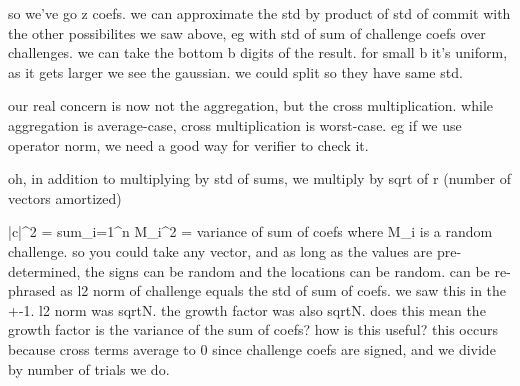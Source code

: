 so we've go z coefs.
we can approximate the std by product of std of commit with the other possibilites we saw above, eg with std of sum of challenge coefs over challenges.
we can take the bottom b digits of the result. for small b it's uniform, as it gets larger we see the gaussian.
we could split so they have same std.

our real concern is now not the aggregation, but the cross multiplication. while aggregation is average-case, cross multiplication is worst-case. eg if we use operator norm, we need a good way for verifier to check it.

oh, in addition to multiplying by std of sums, we multiply by sqrt of r (number of vectors amortized)



|c|^2 = sum_{i=1}^n M_i^2 = variance of sum of coefs
where M_i is a random challenge.
so you could take any vector, and as long as the values are pre-determined, the signs can be random and the locations can be random. 
can be re-phrased as l2 norm of challenge equals the std of sum of coefs.
we saw this in the +-1. l2 norm was sqrt{N}. the growth factor was also sqrt{N}. does this mean the growth factor is the variance of the sum of coefs?
how is this useful?
this occurs because cross terms average to 0 since challenge coefs are signed, and we divide by number of trials we do.






